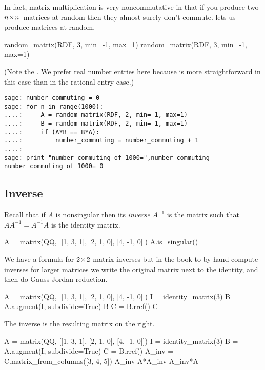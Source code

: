 In fact, matrix multiplication is very noncommutative 
in that if you produce two $n \! \times \! n$~matrices
at random then they almost surely don't commute.
\Sage{} lets us produce matrices at random.
\begin{sageoutput}
random_matrix(RDF, 3, min=-1, max=1)
random_matrix(RDF, 3, min=-1, max=1)
\end{sageoutput}
\noindent  
(Note the .
We prefer real number entries here because
is more straightforward in this case than in the  
rational entry case.)

\begin{lstlisting}
sage: number_commuting = 0 
sage: for n in range(1000):                                       
....:     A = random_matrix(RDF, 2, min=-1, max=1)
....:     B = random_matrix(RDF, 2, min=-1, max=1)
....:     if (A*B == B*A):
....:         number_commuting = number_commuting + 1 
....: 
sage: print "number commuting of 1000=",number_commuting
number commuting of 1000= 0  
\end{lstlisting}

 


\subsection{Inverse}
Recall that if $A$ is nonsingular then its \textit{inverse} $A^{-1}$
is the matrix such that $AA^{-1}=A^{-1}A$ is the identity matrix. 
\begin{sageoutput}
A = matrix(QQ, [[1, 3, 1], [2, 1, 0], [4, -1, 0]])
A.is_singular()
\end{sageoutput}
\noindent
We have a formula for $2 \! \times \! 2$ matrix inverses
but in the book to by-hand compute inverses for larger matrices 
we write the original matrix next to the identity, 
and then do Gauss-Jordan reduction.
\begin{sageoutput}[d,0,1]
A = matrix(QQ, [[1, 3, 1], [2, 1, 0], [4, -1, 0]])
I = identity_matrix(3)
B = A.augment(I, subdivide=True)
B
C = B.rref()
C
\end{sageoutput}
\noindent
The inverse is the resulting matrix on the right.
\begin{sageoutput}[d,0,4]
A = matrix(QQ, [[1, 3, 1], [2, 1, 0], [4, -1, 0]])
I = identity_matrix(3)
B = A.augment(I, subdivide=True)
C = B.rref()
A_inv = C.matrix_from_columns([3, 4, 5])
A_inv
A*A_inv
A_inv*A
\end{sageoutput}

